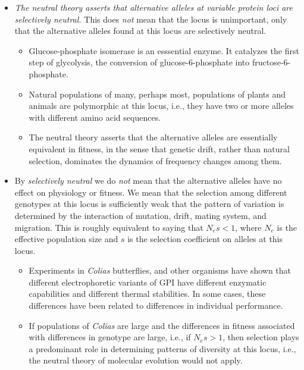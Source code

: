 \begin{itemize}

\item {\it The neutral theory asserts that alternative alleles at
    variable protein loci are selectively neutral.} This does {\it
    not\/} mean that the locus is unimportant, only that the
  alternative alleles found at this locus are selectively
  neutral.

\begin{itemize}

\item Glucose-phosphate isomerase is an esssential enzyme. It
  catalyzes the first step of glycolysis, the conversion of
  glucose-6-phosphate into fructose-6-phosphate.

\item Natural populations of many, perhaps most, populations of plants
  and animals are polymorphic at this locus, i.e., they have two or
  more alleles with different amino acid sequences.

\item The neutral theory asserts that the alternative alleles are
  essentially equivalent in fitness, in the sense that genetic drift,
  rather than natural selection, dominates the dynamics of frequency
  changes among them.

\end{itemize}

\item By {\it selectively neutral\/} we do {\it not\/} mean that the
  alternative alleles have no effect on physiology or fitness. We mean
  that the selection among different genotypes at this locus is
  sufficiently weak that the pattern of variation is determined by the
  interaction of mutation, drift, mating system, and migration. This
  is roughly equivalent to saying that $N_es < 1$, where $N_e$ is the
  effective population size and $s$ is the selection coefficient on
  alleles at this locus.

\begin{itemize}

\item Experiments in {\it Colias\/} butterflies, and other organisms
  have shown that different electrophoretic variants of GPI have
  different enzymatic capabilities and different thermal
  stabilities. In some cases, these differences have been related to
  differences in individual performance.

\item If populations of {\it Colias\/} are large and the differences
  in fitness associated with differences in genotype are large, i.e.,
  if $N_es > 1$, then selection plays a predominant role in
  determining patterns of diversity at this locus, i.e., the neutral
  theory of molecular evolution would not apply.


\end{itemize}
\end{itemize}
